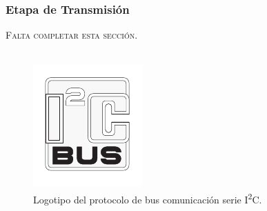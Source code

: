 \subsubsection{Etapa de Transmisión}

{\Bold\scshape\Large Falta completar esta sección.}\\

\lipsum[2]\\

\begin{figure}[h]
    \centering
    \includegraphics[scale=1]{Imagenes/Logo I2C.pdf}
    \caption{Logotipo del protocolo de bus comunicación serie I\textsuperscript{2}C.}
    \label{logo_I2C}
\end{figure}

\lipsum[3]\\